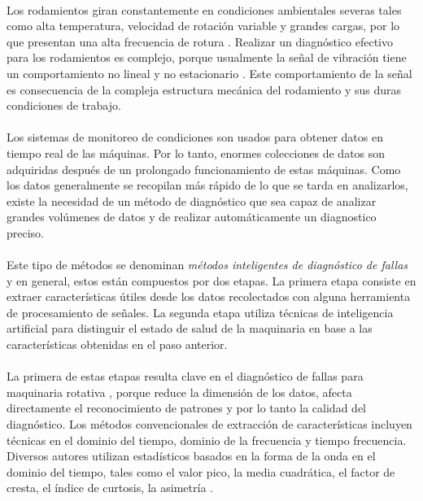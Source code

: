 \documentclass[12pt]{article}%
\begin{document}
\paragraph{}
Los rodamientos giran constantemente en condiciones ambientales severas tales como alta temperatura, velocidad de rotación variable y grandes cargas, por lo que presentan una alta frecuencia de rotura \cite{fu}. Realizar un diagnóstico efectivo para los rodamientos es complejo, porque usualmente la señal de vibración tiene un comportamiento no lineal y no estacionario \cite{li}. Este comportamiento de la señal es consecuencia de la compleja estructura mecánica del rodamiento y sus duras condiciones de trabajo.

\paragraph{}
Los sistemas de monitoreo de condiciones son usados para obtener datos en tiempo real de las máquinas. Por lo tanto, enormes colecciones de datos son adquiridas después de un prolongado funcionamiento de estas máquinas. Como los datos generalmente se recopilan más rápido de lo que se tarda en analizarlos, existe la necesidad de un método de diagnóstico que sea capaz de analizar grandes volúmenes de datos y de realizar automáticamente un diagnostico preciso.

\paragraph{}
Este tipo de métodos se denominan \textit{métodos inteligentes de diagnóstico de fallas} y en general, estos están compuestos por dos etapas. La primera etapa consiste en extraer características útiles desde los datos recolectados con alguna herramienta de procesamiento de señales. La segunda etapa utiliza técnicas de inteligencia artificial para distinguir el estado de salud de la maquinaria en base a las características obtenidas en el paso anterior.

\paragraph{}
La primera de estas etapas resulta clave en el diagnóstico de fallas para maquinaria rotativa \cite{guo}, porque reduce la dimensión de los datos, afecta directamente el reconocimiento de patrones y por lo tanto la calidad del diagnóstico. Los métodos convencionales de extracción de características incluyen técnicas en el dominio del tiempo, dominio de la frecuencia y tiempo frecuencia. Diversos autores utilizan estadísticos basados en la forma de la onda en el dominio del tiempo, tales como el valor pico, la media cuadrática, el factor de cresta, el índice de curtosis, la asimetría \cite{zhu}.
 
\end{document}
